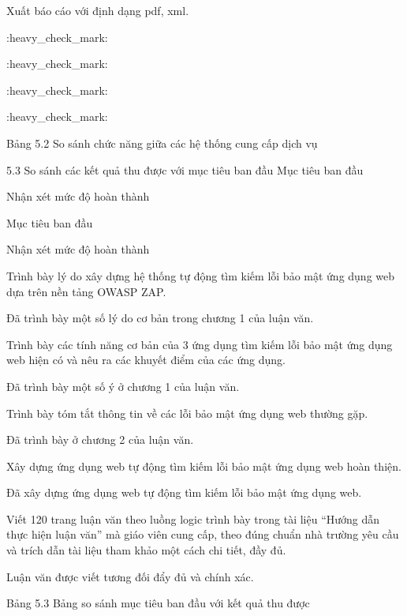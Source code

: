 Xuất báo cáo với định dạng pdf, xml.

:heavy_check_mark:  

:heavy_check_mark:  

:heavy_check_mark:  

:heavy_check_mark:  

Bảng 5.2 So sánh chức năng giữa các hệ thống cung cấp dịch vụ

5.3 So sánh các kết quả thu được với mục tiêu ban đầu
Mục tiêu ban đầu

Nhận xét mức độ hoàn thành

Mục tiêu ban đầu

Nhận xét mức độ hoàn thành

Trình bày lý do xây dựng hệ thống tự động tìm kiếm lỗi bảo mật ứng dụng web dựa trên nền tảng OWASP ZAP.

Đã trình bày một số lý do cơ bản trong chương 1 của luận văn.

Trình bày các tính năng cơ bản của 3 ứng dụng tìm kiếm lỗi bảo mật ứng dụng web hiện có và nêu ra các khuyết điểm của các ứng dụng.

Đã trình bày một số ý ở chương 1 của luận văn.

Trình bày tóm tắt thông tin về các lỗi bảo mật ứng dụng web thường gặp.

Đã trình bày ở chương 2 của luận văn.

Xây dựng ứng dụng web tự động tìm kiếm lỗi bảo mật ứng dụng web hoàn thiện.

Đã xây dựng ứng dụng web tự động tìm kiếm lỗi bảo mật ứng dụng web.

Viết 120 trang luận văn theo luồng logic trình bày trong tài liệu “Hướng dẫn thực hiện luận văn” mà giáo viên cung cấp, theo đúng chuẩn nhà trường yêu cầu và trích dẫn tài liệu tham khảo một cách chi tiết, đầy đủ.

Luận văn được viết tương đối đẩy đủ và chính xác.

 Bảng 5.3 Bảng so sánh mục tiêu ban đầu với kết quả thu được